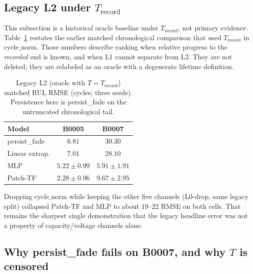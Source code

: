 ﻿\subsection{Legacy L2 under $T_{\mathrm{record}}$}
\label{sec:legacy}

This subsection is a historical oracle baseline under $T_{\mathrm{record}}$, not primary evidence.
Table~\ref{tab:l2legacy} restates the earlier matched chronological comparison that used $T_{\mathrm{record}}$ in $\mathrm{cycle\_norm}$.
Those numbers describe ranking when relative progress to the \emph{recorded} end is known, and when L1 cannot separate from L2.
They are not deleted; they are relabeled as an oracle with a degenerate lifetime definition.

\begin{table}[htbp]
\centering
\caption{Legacy L2 (oracle with $T=T_{\mathrm{record}}$) matched RUL RMSE (cycles; three seeds). Persistence here is persist\_fade on the untruncated chronological tail.}
\label{tab:l2legacy}
\begin{tabular}{@{}lcc@{}}
\toprule
Model & B0005 & B0007 \\
\midrule
persist\_fade & $6.81$ & $30.30$ \\
Linear extrap. & $7.01$ & $28.10$ \\
MLP & $5.22\pm0.99$ & $\mathbf{5.91\pm1.91}$ \\
Patch-TF & $\mathbf{2.28\pm0.96}$ & $9.67\pm2.95$ \\
\bottomrule
\end{tabular}
\end{table}

Dropping $\mathrm{cycle\_norm}$ while keeping the other five channels (L0-drop, same legacy split) collapsed Patch-TF and MLP to about $19$--$22$ RMSE on both cells.
That remains the sharpest single demonstration that the legacy headline error was not a property of capacity/voltage channels alone.

\subsection{Why persist\_fade fails on B0007, and why $T$ is censored}
\label{sec:b0007}

